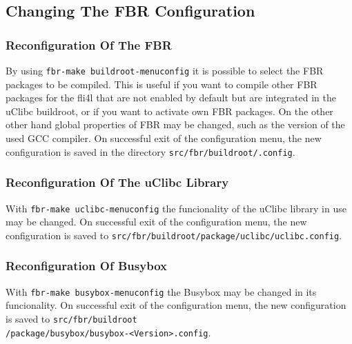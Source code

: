 \subsection{Changing The FBR Configuration}

\subsubsection{Reconfiguration Of The FBR}

By using \texttt{fbr-make buildroot-menuconfig} it is possible to
select the FBR packages to be compiled. This is useful if you
want to compile other FBR packages for the fli4l that are not enabled
by default but are integrated in the uClibc buildroot, or if you
want to activate own FBR packages. On the other other hand  global
properties of FBR may be changed, such as the version of the used
GCC compiler. On successful exit of the configuration menu, the new
configuration is saved in the directory \texttt{src/fbr/buildroot/.config}.


\subsubsection{Reconfiguration Of The uClibc Library}

With \texttt{fbr-make uclibc-menuconfig} the funcionality of the uClibc
library in use may be changed. On successful exit of the configuration menu,
the new configuration is saved to \texttt{src/fbr/buildroot/package/uclibc/uclibc.config}.


\subsubsection{Reconfiguration Of Busybox}

With \texttt{fbr-make busybox-menuconfig} the Busybox may be changed
in its funcionality. On successful exit of the configuration menu,
the new configuration is saved to \texttt{src/fbr/buildroot\\/package/busybox/busybox-<Version>.config}.

